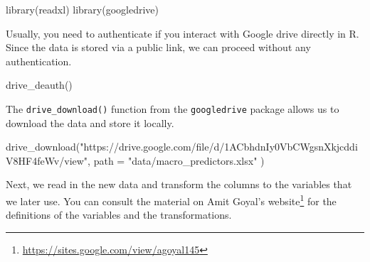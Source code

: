 \documentclass[
]{book}
\newenvironment{Shaded}{\begin{snugshade}}{\end{snugshade}}
\newcommand{\AttributeTok}[1]{\textcolor[rgb]{0.61,0.61,0.61}{#1}}
\newcommand{\FunctionTok}[1]{\textcolor[rgb]{0,0,0}{#1}}
\newcommand{\NormalTok}[1]{#1}
\newcommand{\StringTok}[1]{\textcolor[rgb]{0.5,0.5,0.5}{#1}}
\renewcommand{\href}[2]{#2\footnote{\url{#1}}}
\begin{document}
\begin{Shaded}
\begin{Highlighting}[]
\FunctionTok{library}\NormalTok{(readxl)}
\FunctionTok{library}\NormalTok{(googledrive)}
\end{Highlighting}
\end{Shaded}

Usually, you need to authenticate if you interact with Google drive directly in R. Since the data is stored via a public link, we can proceed without any authentication.

\begin{Shaded}
\begin{Highlighting}[]
\FunctionTok{drive\_deauth}\NormalTok{()}
\end{Highlighting}
\end{Shaded}

The \texttt{drive\_download()} function from the \texttt{googledrive} package allows us to download the data and store it locally.

\begin{Shaded}
\begin{Highlighting}[]
\FunctionTok{drive\_download}\NormalTok{(}\StringTok{"https://drive.google.com/file/d/1ACbhdnIy0VbCWgsnXkjcddiV8HF4feWv/view"}\NormalTok{,}
  \AttributeTok{path =} \StringTok{"data/macro\_predictors.xlsx"}
\NormalTok{)}
\end{Highlighting}
\end{Shaded}

Next, we read in the new data and transform the columns to the variables that we later use. You can consult the material on \href{https://sites.google.com/view/agoyal145}{Amit Goyal's website} for the definitions of the variables and the transformations.
\end{document}
